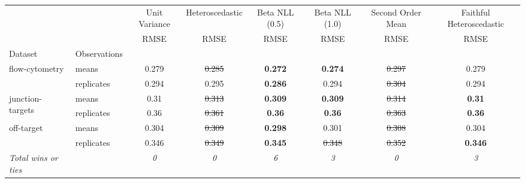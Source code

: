 \begin{tabular}{ll|c|c|c|c|c|c}
\toprule
{} & {} & {Unit Variance} & {Heteroscedastic} & {Beta NLL (0.5)} & {Beta NLL (1.0)} & {Second Order Mean} & {Faithful Heteroscedastic} \\
{} & {} & {RMSE} & {RMSE} & {RMSE} & {RMSE} & {RMSE} & {RMSE} \\
{Dataset} & {Observations} & {} & {} & {} & {} & {} & {} \\
\midrule
\multirow[t]{2}{*}{flow-cytometry} & means & 0.279 & \sout{0.285} & \textbf{0.272} & \textbf{0.274} & \sout{0.297} & 0.279 \\
 & replicates & 0.294 & 0.295 & \textbf{0.286} & 0.294 & \sout{0.304} & 0.294 \\
\multirow[t]{2}{*}{junction-targets} & means & 0.31 & \sout{0.313} & \textbf{0.309} & \textbf{0.309} & \sout{0.314} & \textbf{0.31} \\
 & replicates & 0.36 & \sout{0.361} & \textbf{0.36} & \textbf{0.36} & \sout{0.363} & \textbf{0.36} \\
\multirow[t]{2}{*}{off-target} & means & 0.304 & \sout{0.309} & \textbf{0.298} & 0.301 & \sout{0.308} & 0.304 \\
 & replicates & 0.346 & \sout{0.349} & \textbf{0.345} & \sout{0.348} & \sout{0.352} & \textbf{0.346} \\
\textit{{Total wins or ties}} &  & \textit{0} & \textit{0} & \textit{6} & \textit{3} & \textit{0} & \textit{3} \\
\bottomrule
\end{tabular}

